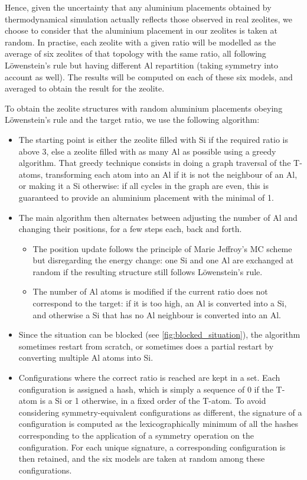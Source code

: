 \documentclass[main.tex]{subfiles}
\begin{document}
Hence, given the uncertainty that any aluminium placements obtained by thermodynamical simulation actually reflects those observed in real zeolites, we choose to consider that the aluminium placement in our zeolites is taken at random. In practise, each zeolite with a given \SiAl ratio will be modelled as the average of six zeolites of that topology with the same \SiAl ratio, all following L\"owenstein's rule but having different Al repartition (taking symmetry into account as well). The results will be computed on each of these six models, and averaged to obtain the result for the zeolite.

To obtain the zeolite structures with random aluminium placements obeying L\"owenstein's rule and the target \SiAl ratio, we use the following algorithm:
\begin{itemize}
    \item The starting point is either the zeolite filled with Si if the required \SiAl ratio is above 3, else a zeolite filled with as many Al as possible using a greedy algorithm. That greedy technique consists in doing a graph traversal of the T-atoms, transforming each atom into an Al if it is not the neighbour of an Al, or making it a Si otherwise: if all cycles in the graph are even, this is guaranteed to provide an aluminium placement with the minimal \SiAl of 1.
    \item The main algorithm then alternates between adjusting the number of Al and changing their positions, for a few steps each, back and forth.
    \begin{itemize}
        \item The position update follows the principle of Marie Jeffroy's MC scheme but disregarding the energy change: one Si and one Al are exchanged at random if the resulting structure still follows L\"owenstein's rule.
        \item The number of Al atoms is modified if the current \SiAl ratio does not correspond to the target: if it is too high, an Al is converted into a Si, and otherwise a Si that has no Al neighbour is converted into an Al.
    \end{itemize}
    \item Since the situation can be blocked (see \cref{fig:blocked_situation}), the algorithm sometimes restart from scratch, or sometimes does a partial restart by converting multiple Al atoms into Si.
    \item Configurations where the correct \SiAl ratio is reached are kept in a set. Each configuration is assigned a hash, which is simply a sequence of 0 if the T-atom is a Si or 1 otherwise, in a fixed order of the T-atom. To avoid considering symmetry-equivalent configurations as different, the signature of a configuration is computed as the lexicographically minimum of all the hashes corresponding to the application of a symmetry operation on the configuration. For each unique signature, a corresponding configuration is then retained, and the six models are taken at random among these configurations.
\end{itemize}\label{aluminiumhash}
\end{document}
